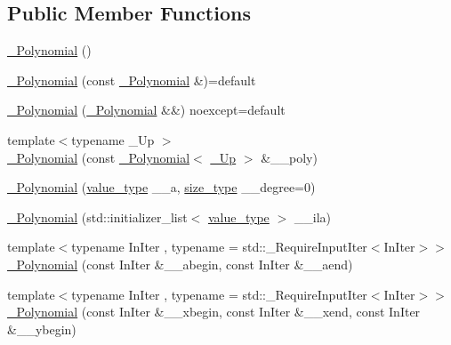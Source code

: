 \subsection*{Public Member Functions}
\begin{DoxyCompactItemize}
\item 
\hyperlink{class____gnu__cxx_1_1__Polynomial_ad2baf4c12b7e3ab131a592afa3f391ae}{\+\_\+\+Polynomial} ()
\item 
\hyperlink{class____gnu__cxx_1_1__Polynomial_ac0a657bc804f3db8a03acfd1b98abb39}{\+\_\+\+Polynomial} (const \hyperlink{class____gnu__cxx_1_1__Polynomial}{\+\_\+\+Polynomial} \&)=default
\item 
\hyperlink{class____gnu__cxx_1_1__Polynomial_a87bad90934c9752b51cdece15a5b369f}{\+\_\+\+Polynomial} (\hyperlink{class____gnu__cxx_1_1__Polynomial}{\+\_\+\+Polynomial} \&\&) noexcept=default
\item 
{\footnotesize template$<$typename \+\_\+\+Up $>$ }\\\hyperlink{class____gnu__cxx_1_1__Polynomial_ae744374b972b91a9609ba6cc1330bbfd}{\+\_\+\+Polynomial} (const \hyperlink{class____gnu__cxx_1_1__Polynomial}{\+\_\+\+Polynomial}$<$ \hyperlink{class____gnu__cxx_1_1__Polynomial_a242114d4b86648a5dff67a8221f80d40}{\+\_\+\+Up} $>$ \&\+\_\+\+\_\+poly)
\item 
\hyperlink{class____gnu__cxx_1_1__Polynomial_ad89b416fedd4e3a23b484d5269767a93}{\+\_\+\+Polynomial} (\hyperlink{class____gnu__cxx_1_1__Polynomial_a725563351f50e76084a7a016c06f8a53}{value\+\_\+type} \+\_\+\+\_\+a, \hyperlink{class____gnu__cxx_1_1__Polynomial_a6afe219c123c7a2fdc5abac8a6639053}{size\+\_\+type} \+\_\+\+\_\+degree=0)
\item 
\hyperlink{class____gnu__cxx_1_1__Polynomial_acc6b7b2a52600f62bf8dee99f2fb787c}{\+\_\+\+Polynomial} (std\+::initializer\+\_\+list$<$ \hyperlink{class____gnu__cxx_1_1__Polynomial_a725563351f50e76084a7a016c06f8a53}{value\+\_\+type} $>$ \+\_\+\+\_\+ila)
\item 
{\footnotesize template$<$typename In\+Iter , typename  = std\+::\+\_\+\+Require\+Input\+Iter$<$\+In\+Iter$>$$>$ }\\\hyperlink{class____gnu__cxx_1_1__Polynomial_a45589d1d036861179488c44f3029f335}{\+\_\+\+Polynomial} (const In\+Iter \&\+\_\+\+\_\+abegin, const In\+Iter \&\+\_\+\+\_\+aend)
\item 
{\footnotesize template$<$typename In\+Iter , typename  = std\+::\+\_\+\+Require\+Input\+Iter$<$\+In\+Iter$>$$>$ }\\\hyperlink{class____gnu__cxx_1_1__Polynomial_a86249f53e97e72eff11242a8ba85ba4c}{\+\_\+\+Polynomial} (const In\+Iter \&\+\_\+\+\_\+xbegin, const In\+Iter \&\+\_\+\+\_\+xend, const In\+Iter \&\+\_\+\+\_\+ybegin)

\end{DoxyCompactItemize}
